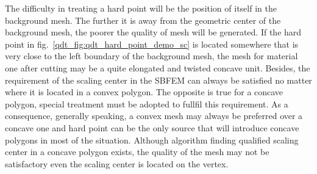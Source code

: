 The difficulty in treating a hard point will be the position of itself in the background mesh.
The further it is away from the geometric center of the background mesh, the poorer the quality of mesh will be generated.
If the hard point in fig.~\ref{qdt_fig:qdt_hard_point_demo_sc} is located somewhere that is very close to the left boundary of the background mesh, the mesh for material one after cutting may be a quite elongated and twisted concave unit.
Besides, the requirement of the scaling center in the SBFEM can always be satisfied no matter where it is located in a convex polygon.
The opposite is true for a concave polygon, special treatment must be adopted to fullfil this requirement.
As a consequence, generally speaking, a convex mesh may always be preferred over a concave one and hard point can be the only source that will introduce concave polygons in most of the situation.
Although algorithm finding qualified scaling center in a concave polygon exists, the quality of the mesh may not be satisfactory even the scaling center is located on the vertex.


